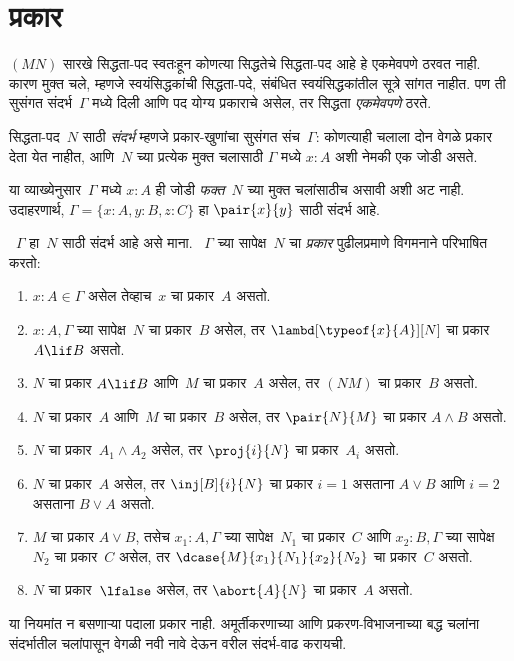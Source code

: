 \section{प्रकार}\label{int:pty:typ:sec}

$(MN)$ सारखे सिद्धता-पद स्वतःहून कोणत्या सिद्धतेचे
सिद्धता-पद आहे हे एकमेवपणे ठरवत नाही. कारण मुक्त चले,
म्हणजे स्वयंसिद्धकांची सिद्धता-पदे, संबंधित स्वयंसिद्धकांतील
सूत्रे सांगत नाहीत. पण ती सुसंगत संदर्भ~$\Gamma$ मध्ये
दिली आणि पद योग्य प्रकाराचे असेल, तर सिद्धता \emph{एकमेवपणे} ठरते.

\begin{defn}
सिद्धता-पद~$N$ साठी \emph{संदर्भ} म्हणजे प्रकार-खुणांचा
सुसंगत संच~$\Gamma$: कोणत्याही चलाला दोन वेगळे प्रकार
देता येत नाहीत, आणि~$N$ च्या प्रत्येक मुक्त चलासाठी
$\Gamma$ मध्ये $x:A$ अशी नेमकी एक जोडी असते.
\end{defn}

या व्याख्येनुसार~$\Gamma$ मध्ये $x:A$ ही जोडी
\emph{फक्त}~$N$ च्या मुक्त चलांसाठीच असावी अशी अट नाही.
उदाहरणार्थ, $\Gamma = \{x:A, y:B, z:C\}$ हा
$\pair{x}{y}$ साठी संदर्भ आहे.

\begin{defn}\label{int:pty:typ:defn:type}
  ~$\Gamma$ हा~$N$ साठी संदर्भ आहे असे माना.
  ~$\Gamma$ च्या सापेक्ष~$N$ चा \emph{प्रकार}
  पुढीलप्रमाणे विगमनाने परिभाषित करतो:
  \begin{enumerate}
  \item $x:A \in \Gamma$ असेल तेव्हाच~$x$ चा प्रकार~$A$ असतो.
  \item $x:A, \Gamma$ च्या सापेक्ष~$N$ चा प्रकार~$B$
    असेल, तर $\lambd[\typeof{x}{A}][N]$ चा प्रकार
    $A \lif B$ असतो.
  \item $N$ चा प्रकार $A \lif B$ आणि~$M$ चा प्रकार~$A$
    असेल, तर $(NM)$ चा प्रकार~$B$ असतो.
  \item $N$ चा प्रकार~$A$ आणि~$M$ चा प्रकार~$B$
    असेल, तर $\pair{N}{M}$ चा प्रकार $A \land B$ असतो.
  \item $N$ चा प्रकार~$A_1 \land A_2$ असेल, तर
    $\proj{i}{N}$ चा प्रकार~$A_i$ असतो.
  \item $N$ चा प्रकार~$A$ असेल, तर
    $\inj[B]{i}{N}$ चा प्रकार $i=1$ असताना
    $A \lor B$ आणि $i=2$ असताना $B \lor A$ असतो.
  \item $M$ चा प्रकार $A \lor B$, तसेच
    $x_1:A, \Gamma$ च्या सापेक्ष~$N_1$ चा प्रकार~$C$
    आणि $x_2:B, \Gamma$ च्या सापेक्ष~$N_2$ चा
    प्रकार~$C$ असेल, तर
    $\dcase{M}{x_1}{N_1}{x_2}{N_2}$ चा प्रकार~$C$ असतो.
  \item $N$ चा प्रकार~$\lfalse$ असेल, तर
    $\abort{A}{N}$ चा प्रकार~$A$ असतो.
  \end{enumerate}
\end{defn}
या नियमांत न बसणाऱ्या पदाला प्रकार नाही. अमूर्तीकरणाच्या
आणि प्रकरण-विभाजनाच्या बद्ध चलांना संदर्भातील चलांपासून वेगळी
नवी नावे देऊन वरील संदर्भ-वाढ करायची.

